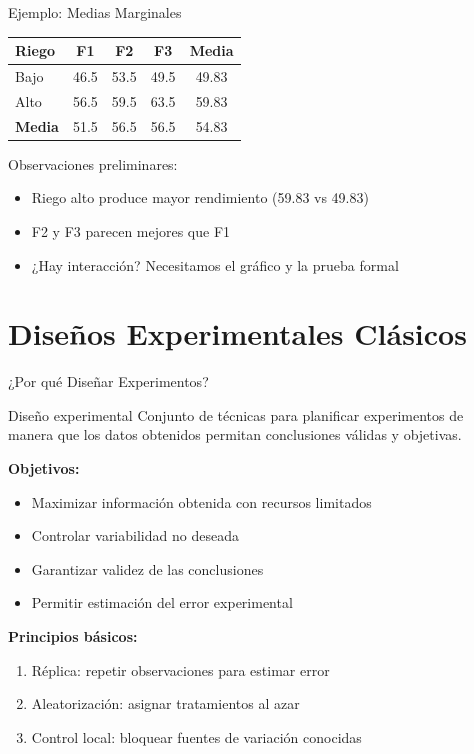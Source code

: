 \documentclass[aspectratio=169]{beamer}
\begin{document}
\begin{frame}{Ejemplo: Medias Marginales}
\begin{table}
\centering
\begin{tabular}{lcccc}
\toprule
\textbf{Riego} & \textbf{F1} & \textbf{F2} & \textbf{F3} & \textbf{Media} \\
\midrule
Bajo & 46.5 & 53.5 & 49.5 & 49.83 \\
Alto & 56.5 & 59.5 & 63.5 & 59.83 \\
\midrule
\textbf{Media} & 51.5 & 56.5 & 56.5 & 54.83 \\
\bottomrule
\end{tabular}
\end{table}

\vspace{0.3cm}
Observaciones preliminares:
\begin{itemize}
\item Riego alto produce mayor rendimiento (59.83 vs 49.83)
\item F2 y F3 parecen mejores que F1
\item ¿Hay interacción? Necesitamos el gráfico y la prueba formal
\end{itemize}
\end{frame}

\section{Diseños Experimentales Clásicos}

\begin{frame}{¿Por qué Diseñar Experimentos?}
\begin{block}{Diseño experimental}
Conjunto de técnicas para planificar experimentos de manera que los datos obtenidos permitan conclusiones válidas y objetivas.
\end{block}

\vspace{0.3cm}
\textbf{Objetivos:}
\begin{itemize}
\item Maximizar información obtenida con recursos limitados
\item Controlar variabilidad no deseada
\item Garantizar validez de las conclusiones
\item Permitir estimación del error experimental
\end{itemize}

\vspace{0.3cm}
\textbf{Principios básicos:}
\begin{enumerate}
\item Réplica: repetir observaciones para estimar error
\item Aleatorización: asignar tratamientos al azar
\item Control local: bloquear fuentes de variación conocidas
\end{enumerate}
\end{frame}
\end{document}
